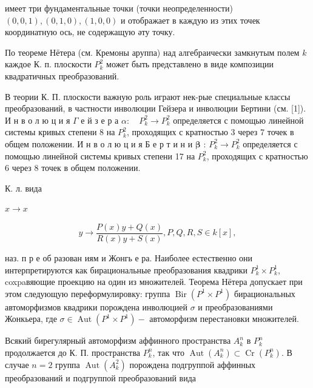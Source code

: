 \documentclass[10pt]{article}
\begin{document}
имеет три фундаментальные точки (точки неопределенности) $(0,0,1),(0,1,0),(1,0,0)$ и отображает в каждую из этих точек координатную ось, не содержащую әту точку.



По теореме Нётера (см. Кремоны аруппа) над алгебраически замкнутым полем $k$ каждое К. п. плоскости $P_{k}^{2}$ может быть представлено в виде композиции квадратичных преобразований.



В теории К. П. плоскости важную роль играют нек-рые специальные классы преобразований, в частности инволюции Гейзера и инволюции Бертини (см. [1]). И н в о л ю ц и я $\Gamma$ е й з е р а $\alpha: \quad P_{k}^{2} \rightarrow P_{k}^{2}$ определяется с помощью линейной системы кривых степени 8 на $P_{k}^{2}$, проходящих с кратностью 3 через 7 точек в общем положении. И н в о л ю ц и я Б е р т и н и $\boldsymbol{\beta}$ : $P_{k}^{2} \rightarrow P_{k}^{2}$ определяется с помощью линейной системы кривых степени 17 на $P_{k}^{2}$, проходящих с кратностью 6 через 8 точек в общем положении.



К. л. вида



$x \longrightarrow x$



\[

y \rightarrow \frac{P(x) y+Q(x)}{R(x) y+S(x)}, P, Q, R, S \in k[x],

\]



наз. п р е об разован иям и Жонгь е ра. Наиболее естественно они интерпретируются как бирациональные преобразования квадрики $P_{k}^{1} \times P_{k}^{1}$, coxpaвяющие проекцию на один из множителей. Теорема Нётера допускает при этом следующую переформулировку: группа $\operatorname{Bir}\left(P^{1} \times P^{1}\right)$ бирациональных автоморфизмов квадрики порождена инволюцией $\sigma$ и преобразованиями Жонкьера, где $\sigma \in \operatorname{Aut}\left(P^{1} \times P^{1}\right)-$ автоморфизм перестановки множителей.



Всякий бирегулярный автоморфизм аффинного пространства $A_{k}^{n}$ в $P_{k}^{n}$ продолжается до К. П. пространства $P_{k}^{n}$, так что $\operatorname{Aut}\left(A_{k}^{n}\right) \subset \operatorname{Cr}\left(P_{k}^{n}\right)$. В случае $n=2$ группа $\operatorname{Aut}\left(A_{k}^{2}\right)$ порождена подгруппой аффинных преобразований и подгруппой преобразований вида
\end{document}
